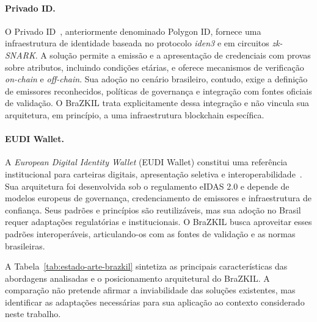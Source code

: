 \documentclass[12pt]{article}
\begin{document}
\paragraph{Privado ID.}
O Privado ID~\cite{privadoid2024}, anteriormente denominado Polygon ID, fornece uma infraestrutura de identidade baseada no protocolo \textit{iden3} e em circuitos \textit{zk-SNARK}. A solução permite a emissão e a apresentação de credenciais com provas sobre atributos, incluindo condições etárias, e oferece mecanismos de verificação \textit{on-chain} e \textit{off-chain}. Sua adoção no cenário brasileiro, contudo, exige a definição de emissores reconhecidos, políticas de governança e integração com fontes oficiais de validação. O BraZKIL trata explicitamente dessa integração e não vincula sua arquitetura, em princípio, a uma infraestrutura blockchain específica.

\paragraph{EUDI Wallet.}
A \textit{European Digital Identity Wallet} (EUDI Wallet) constitui uma referência institucional para carteiras digitais, apresentação seletiva e interoperabilidade~\cite{europeancommission2025eudiageverification}. Sua arquitetura foi desenvolvida sob o regulamento eIDAS 2.0 e depende de modelos europeus de governança, credenciamento de emissores e infraestrutura de confiança. Seus padrões e princípios são reutilizáveis, mas sua adoção no Brasil requer adaptações regulatórias e institucionais. O BraZKIL busca aproveitar esses padrões interoperáveis, articulando-os com as fontes de validação e as normas brasileiras.

A Tabela~\ref{tab:estado-arte-brazkil} sintetiza as principais características das abordagens analisadas e o posicionamento arquitetural do BraZKIL. A comparação não pretende afirmar a inviabilidade das soluções existentes, mas identificar as adaptações necessárias para sua aplicação ao contexto considerado neste trabalho.
\end{document}
